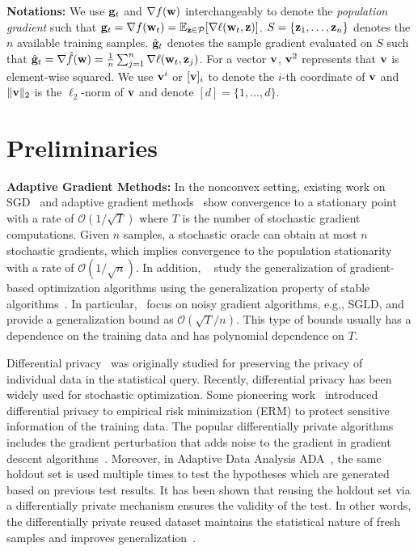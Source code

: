 \documentclass[11pt]{article}
\begin{document}
\textbf{Notations:} 
We use $\mathbf{g}_t$ and $\nabla f(\mathbf{w})$ interchangeably to denote the \emph{population gradient} such that $\g_t = \nabla f(\w_t) = \mathbb{E}_{\z \in \cP} [\nabla \ell(\w_t, \z)]$. 
$S = \left\{\mathbf{z}_{1}, \dots, \mathbf{z}_{n}\right\}$ denotes the $n$ available training samples. 
$\hat {\mathbf{g}}_t$ denotes the sample gradient evaluated on $S$ such that $\hat {\mathbf{g}}_t = \nabla \hat f(\mathbf{w}) = \frac{1}{n}\sum_{j=1}^n \nabla \ell(\mathbf{w}_t, \mathbf{z}_j)$. For a vector $\mathbf{v}$, $\mathbf{v}^2$ represents that $\mathbf{v}$ is element-wise squared.  
We use $\mathbf{v}^i$ or $[\mathbf{v}]_i$ to denote the $i$-th coordinate of $\mathbf{v}$ and $\|\mathbf{v}\|_2$ is the $\ell_2$-norm of $\mathbf{v}$ and denote $[d]=\{1,\dots,d\}$.

\vspace{-0.05in}
\section{Preliminaries}
\vspace{-0.05in}

{\bf Adaptive Gradient Methods:} 
In the nonconvex setting, existing work on SGD~\citep{ghla2013} and adaptive gradient methods~\citep{zare18, wawu19, zosh2019, cheli2019} show convergence to a stationary point with a rate of  $\mathcal{O}(1/\sqrt{T})$ where $T$ is the number of stochastic gradient computations. Given $n$ samples, a stochastic oracle can obtain at most $n$ stochastic gradients, which implies convergence to the population stationarity with a rate of $\mathcal{O}(1/\sqrt{n})$.
In addition, ~\citet{kula2018, rara2017, hare2016,mowa2018, pejo2018, cheli2019, lilu2019} study the generalization of gradient-based optimization algorithms using the generalization property of stable algorithms~\cite{boel02}. 
In particular,~\citet{rara2017, mowa2018, lilu2019, pejo2018} focus on noisy gradient algorithms, e.g., \textsc{SGLD}, and provide a generalization bound as $\mathcal{O}(\sqrt{T}/n)$. 
This type of bounds usually has a dependence on the training data and has polynomial dependence on $T$.  

Differential privacy~\cite{dwro2014} was originally studied for preserving the privacy of individual data in the statistical query. 
Recently, differential privacy has been widely used for stochastic optimization. 
Some pioneering work~\citep{chmo2011, basm2014, waye2017} introduced differential privacy to empirical risk minimization (ERM) to protect sensitive information of the training data. 
The popular differentially private algorithms includes the gradient perturbation that adds noise to the gradient in gradient descent algorithms~\citep{chmo2011,basm2014,waxu2019}.
Moreover, in Adaptive Data Analysis \textsc{ADA}~\citep{dwfe2015a,dwfe2015b,dwfe2015c}, the same holdout set is used multiple times to test the hypotheses which are generated based on previous test results.
It has been shown that reusing the holdout set via a differentially private mechanism ensures the validity of the test. 
In other words, the differentially private reused dataset maintains the statistical nature of fresh samples and improves generalization~\citep{zhch2018}. 
\end{document}
